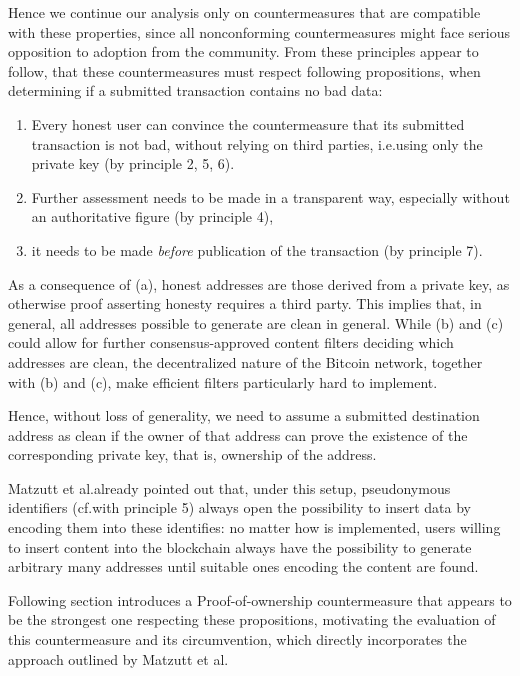 \documentclass[a4paper,11pt,titlepage]{scrbook}
\begin{document}
Hence we continue our analysis only on countermeasures that are compatible with these properties,
since all nonconforming countermeasures might face serious opposition to adoption from the community.
From these principles appear to follow, that these countermeasures must respect following propositions, when determining if a submitted transaction contains no bad data:
\begin{enumerate}
    \item Every honest user can convince the countermeasure that its submitted transaction is not bad, without relying on third parties, i.e.\@ using only the private key (by principle 2, 5, 6).
    \item Further assessment needs to be made in a transparent way, especially without an authoritative figure (by principle 4),
    \item it needs to be made \emph{before} publication of the transaction (by principle 7).
\end{enumerate}
As a consequence of (a), honest addresses are those derived from a private key, as otherwise proof asserting honesty requires a third party.
This implies that, in general, all addresses possible to generate are clean in general.
While (b) and (c) could allow for further consensus-approved content filters deciding which addresses are clean, the decentralized nature of the Bitcoin network, together with (b) and (c), make efficient filters particularly hard to implement.

Hence, without loss of generality, we need to assume a submitted destination address as clean if the owner of that address can prove the existence of the corresponding private key, that is, ownership of the address.

Matzutt et al.\@ already pointed out that, under this setup, pseudonymous identifiers (cf.\@ with principle 5) always open the possibility to insert data by encoding them into these identifies: no matter how  is implemented, users willing to insert content into the blockchain always have the possibility to generate arbitrary many addresses until suitable ones encoding the content are found. \cite[sec.~III.C]{matzutt_thwarting_2018}

Following section introduces a Proof-of-ownership countermeasure that appears to be the strongest one respecting these propositions, motivating the evaluation of this countermeasure and its circumvention, which directly incorporates the approach outlined by Matzutt et al.
\end{document}
